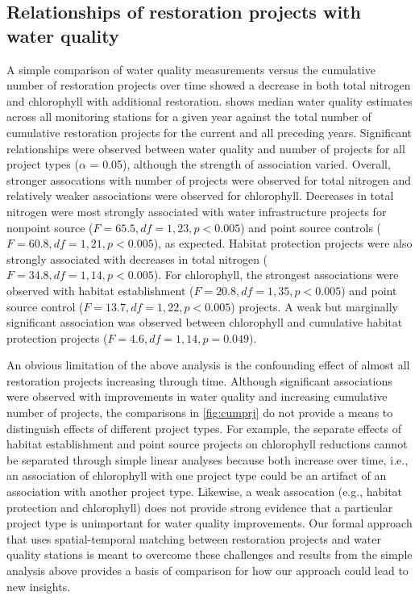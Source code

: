 \documentclass[]{article}
\begin{document}
\hypertarget{relationships-of-restoration-projects-with-water-quality}{%
\subsection{Relationships of restoration projects with water
quality}\label{relationships-of-restoration-projects-with-water-quality}}

A simple comparison of water quality measurements versus the cumulative
number of restoration projects over time showed a decrease in both total
nitrogen and chlorophyll with additional restoration. 
shows median water quality estimates across all monitoring stations for
a given year against the total number of cumulative restoration projects
for the current and all preceding years. Significant relationships were
observed between water quality and number of projects for all project
types (\(\alpha\) = 0.05), although the strength of association varied.
Overall, stronger assocations with number of projects were observed for
total nitrogen and relatively weaker associations were observed for
chlorophyll. Decreases in total nitrogen were most strongly associated
with water infrastructure projects for nonpoint source
(\(F=65.5, df = 1, 23, p < 0.005\)) and point source controls
(\(F=60.8, df = 1, 21, p < 0.005\)), as expected. Habitat protection
projects were also strongly associated with decreases in total nitrogen
(\(F=34.8, df = 1, 14, p < 0.005\)). For chlorophyll, the strongest
associations were observed with habitat establishment
(\(F=20.8, df = 1, 35, p< 0.005\)) and point source control
(\(F=13.7, df = 1, 22, p < 0.005\)) projects. A weak but marginally
significant association was observed between chlorophyll and cumulative
habitat protection projects (\(F=4.6, df = 1, 14, p = 0.049\)).

An obvious limitation of the above analysis is the confounding effect of
almost all restoration projects increasing through time. Although
significant associations were observed with improvements in water
quality and increasing cumulative number of projects, the comparisons in
\cref{fig:cumprj} do not provide a means to distinguish effects of
different project types. For example, the separate effects of habitat
establishment and point source projects on chlorophyll reductions cannot
be separated through simple linear analyses because both increase over
time, i.e., an association of chlorophyll with one project type could be
an artifact of an association with another project type. Likewise, a
weak assocation (e.g., habitat protection and chlorophyll) does not
provide strong evidence that a particular project type is unimportant
for water quality improvements. Our formal approach that uses
spatial-temporal matching between restoration projects and water quality
stations is meant to overcome these challenges and results from the
simple analysis above provides a basis of comparison for how our
approach could lead to new insights.
\end{document}
